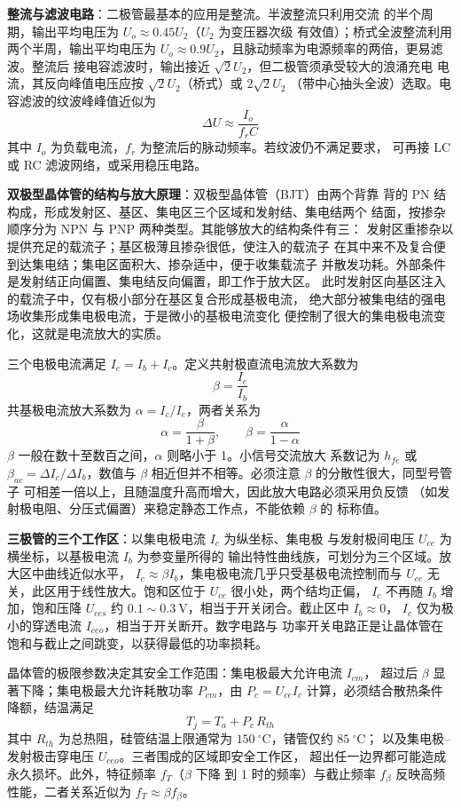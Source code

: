 \textbf{整流与滤波电路}：二极管最基本的应用是整流。半波整流只利用交流
的半个周期，输出平均电压为 $U_o \approx 0.45U_2$（$U_2$ 为变压器次级
有效值）；桥式全波整流利用两个半周，输出平均电压为
$U_o \approx 0.9U_2$，且脉动频率为电源频率的两倍，更易滤波。整流后
接电容滤波时，输出接近 $\sqrt{2}U_2$，但二极管须承受较大的浪涌充电
电流，其反向峰值电压应按 $\sqrt{2}U_2$（桥式）或 $2\sqrt{2}U_2$
（带中心抽头全波）选取。电容滤波的纹波峰峰值近似为
\[
\Delta U \approx \frac{I_o}{f_r C}
\]
其中 $I_o$ 为负载电流，$f_r$ 为整流后的脉动频率。若纹波仍不满足要求，
可再接 LC 或 RC 滤波网络，或采用稳压电路。

\textbf{双极型晶体管的结构与放大原理}：双极型晶体管（BJT）由两个背靠
背的 PN 结构成，形成发射区、基区、集电区三个区域和发射结、集电结两个
结面，按掺杂顺序分为 NPN 与 PNP 两种类型。其能够放大的结构条件有三：
发射区重掺杂以提供充足的载流子；基区极薄且掺杂很低，使注入的载流子
在其中来不及复合便到达集电结；集电区面积大、掺杂适中，便于收集载流子
并散发功耗。外部条件是发射结正向偏置、集电结反向偏置，即工作于放大区。
此时发射区向基区注入的载流子中，仅有极小部分在基区复合形成基极电流，
绝大部分被集电结的强电场收集形成集电极电流，于是微小的基极电流变化
便控制了很大的集电极电流变化，这就是电流放大的实质。

三个电极电流满足 $I_e = I_b + I_c$。定义共射极直流电流放大系数为
\[
\beta = \frac{I_c}{I_b}
\]
共基极电流放大系数为 $\alpha = I_c/I_e$，两者关系为
\begin{equation}
\alpha = \frac{\beta}{1+\beta}, \qquad \beta = \frac{\alpha}{1-\alpha}
\end{equation}
$\beta$ 一般在数十至数百之间，$\alpha$ 则略小于 1。小信号交流放大
系数记为 $h_{fe}$ 或 $\beta_{ac} = \Delta I_c/\Delta I_b$，数值与
$\beta$ 相近但并不相等。必须注意 $\beta$ 的分散性很大，同型号管子
可相差一倍以上，且随温度升高而增大，因此放大电路必须采用负反馈
（如发射极电阻、分压式偏置）来稳定静态工作点，不能依赖 $\beta$ 的
标称值。

\textbf{三极管的三个工作区}：以集电极电流 $I_c$ 为纵坐标、集电极
与发射极间电压 $U_{ce}$ 为横坐标，以基极电流 $I_b$ 为参变量所得的
输出特性曲线族，可划分为三个区域。放大区中曲线近似水平，
$I_c \approx \beta I_b$，集电极电流几乎只受基极电流控制而与 $U_{ce}$
无关，此区用于线性放大。饱和区位于 $U_{ce}$ 很小处，两个结均正偏，
$I_c$ 不再随 $I_b$ 增加，饱和压降 $U_{ces}$ 约
$0.1\sim0.3\ \mathrm{V}$，相当于开关闭合。截止区中 $I_b \approx 0$，
$I_c$ 仅为极小的穿透电流 $I_{ceo}$，相当于开关断开。数字电路与
功率开关电路正是让晶体管在饱和与截止之间跳变，以获得最低的功率损耗。

晶体管的极限参数决定其安全工作范围：集电极最大允许电流 $I_{cm}$，
超过后 $\beta$ 显著下降；集电极最大允许耗散功率 $P_{cm}$，由
$P_c = U_{ce}I_c$ 计算，必须结合散热条件降额，结温满足
\[
T_j = T_a + P_c\,R_{th}
\]
其中 $R_{th}$ 为总热阻，硅管结温上限通常为
$150\ ^{\circ}\mathrm{C}$，锗管仅约 $85\ ^{\circ}\mathrm{C}$；
以及集电极--发射极击穿电压 $U_{ceo}$。三者围成的区域即安全工作区，
超出任一边界都可能造成永久损坏。此外，特征频率 $f_T$（$\beta$ 下降
到 1 时的频率）与截止频率 $f_\beta$ 反映高频性能，二者关系近似为
$f_T \approx \beta f_\beta$。

